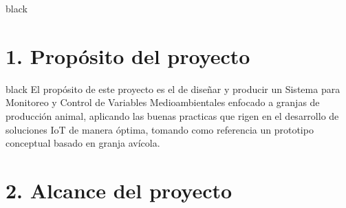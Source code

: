\documentclass[11pt]{charter}
\begin{document}
\begin{consigna}{black}
%
%
%
% 

\end{consigna}


\hfill \break
\section{1. Propósito del proyecto}
\label{sec:proposito}
\begin{consigna}{black} 
El propósito de este proyecto es el de diseñar y producir un Sistema para Monitoreo y Control de Variables Medioambientales enfocado a granjas de producción animal, aplicando las buenas practicas que rigen en el desarrollo de soluciones IoT de manera óptima, tomando como referencia un prototipo conceptual basado en granja avícola.
\end{consigna}


\newpage
\section{2. Alcance del proyecto}
\label{sec:alcance}
\end{document}
